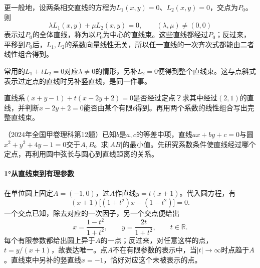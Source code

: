 更一般地，设两条相交直线的方程为\(L_1(x,y)=0\)、\(L_2(x,y)=0\)，交点为\(P_0\)。则
\begin{equation}\label{eq:quadratic-line-pencil}
    \lambda L_1(x,y)+\mu L_2(x,y)=0,
    \qquad (\lambda,\mu)\ne(0,0)
\end{equation}
表示过\(P_0\)的全体直线，称为以\(P_0\)为中心的{\heiti{}直线束}。这些直线都经过\(P_0\)；反过来，平移到\(P_0\)后，\(L_1,L_2\)的系数向量线性无关，所以任一直线的一次齐次式都能由二者线性组合得到。

常用的\(L_1+tL_2=0\)对应\(\lambda\ne0\)的情形，另补\(L_2=0\)便得到整个直线束。这与点斜式表示过定点的直线时另补竖直线，是同一件事。

\par\noindent\begin{minipage}{\linewidth}
\begin{example}
直线系\((x+y-1)+t(x-2y+2)=0\)是否经过定点？求其中经过\((2,1)\)的直线，并判断\(x-2y+2=0\)能否由某个有限\(t\)得到。再用两个系数的线性组合写出完整直线束。
\end{example}
\end{minipage}\par


\par\noindent\begin{minipage}{\linewidth}
\begin{example}
（2024年全国甲卷理科第12题）已知\(b\)是\(a,c\)的等差中项，直线\(ax+by+c=0\)与圆\(x^2+y^2+4y-1=0\)交于\(A,B\)。求\(|AB|\)的最小值。先研究系数条件使直线经过哪个定点，再利用圆中弦长与圆心到直线距离的关系。
\end{example}
\end{minipage}\par


\paragraph{1°从直线束到有理参数} \mbox{}

在单位圆上固定\(A=(-1,0)\)，过\(A\)作直线\(y=t(x+1)\)。代入圆方程，有
\begin{equation*}
    (x+1)\bigl[(1+t^2)x-(1-t^2)\bigr]=0 .
\end{equation*}
一个交点已知，除去对应的一次因子，另一个交点便给出
\begin{equation}\label{eq:quadratic-circle-rational-parametric}
    x=\frac{1-t^2}{1+t^2},\qquad
    y=\frac{2t}{1+t^2},\qquad t\in\mathbb R .
\end{equation}
每个有限参数都给出圆上异于\(A\)的一点；反过来，对任意这样的点，\(t=y/(x+1)\)，故表达唯一。点\(A\)不在有限参数的表示中，当\(|t|\to\infty\)时点趋于\(A\)。直线束中另补的竖直线\(x=-1\)，恰好对应这个未被表示的点。

